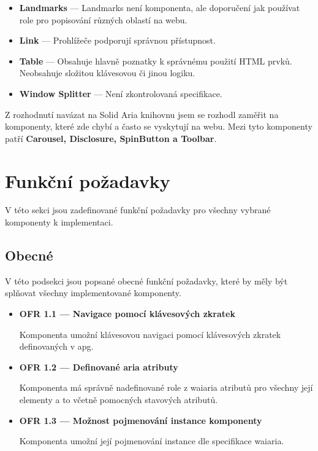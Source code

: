 \begin{itemize}
      \item \textbf{Landmarks} --- Landmarks není komponenta, ale doporučení jak používat role pro popisování různých oblastí na webu.
      \item \textbf{Link} --- Prohlížeče podporují správnou přístupnost.
      \item \textbf{Table} --- Obsahuje hlavně poznatky k správnému použití HTML prvků. Neobsahuje složitou klávesovou či jinou logiku.
      \item \textbf{Window Splitter} --- Není zkontrolovaná specifikace.
\end{itemize}

Z rozhodnutí navázat na Solid Aria knihovnu jsem se rozhodl zaměřit na komponenty, které zde chybí a často se vyskytují na webu.
Mezi tyto komponenty patří \textbf{Carousel, Disclosure, SpinButton a Toolbar}.

\section{Funkční požadavky}

V této sekci jsou zadefinované funkční požadavky pro všechny vybrané komponenty k implementaci.

\subsection{Obecné}

V této podsekci jsou popsané obecné funkční požadavky, které by měly být splňovat všechny implementované komponenty.

\begin{itemize}
      \item \textbf{OFR 1.1 --- Navigace pomocí klávesových zkratek}\label{ofr11}

            Komponenta umožní klávesovou navigaci pomocí klávesových zkratek definovaných v \gls{apg}.

      \item \textbf{OFR 1.2 --- Definované aria atributy}\label{ofr12}

            Komponenta má správně nadefinované role z \gls{waiaria} atributů pro všechny její elementy a to včetně pomocných stavových atributů.

      \item \textbf{OFR 1.3 --- Možnost pojmenování instance komponenty}\label{ofr13}

            Komponenta umožní její pojmenování instance dle specifikace \gls{waiaria}.
\end{itemize}

